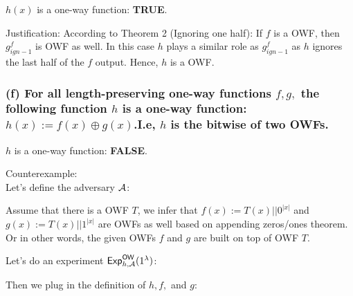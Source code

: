 \(h(x)\) is a one-way function: \textbf{TRUE}.

Justification: According to Theorem 2 (Ignoring one half): If \(f\) is a OWF, then
\(g^f_{ign-1}\) is OWF as well. In this case \(h\) plays a similar role as \(g^f_{ign-1}\)
as \(h\) ignores the last half of the \(f\) output. Hence, \(h\) is a OWF.


\subsubsection{(f) For all length-preserving one-way functions \(f, g,\) the following function
\(h\) is a one-way function: \(h(x):=f(x) \oplus g(x)\).I.e, \(h\) is the bitwise \xor of two OWFs.}

\(h\) is a one-way function: \textbf{FALSE}.

Counterexample:\\
Let's define the adversary \(\mathcal{A}\):
\begin{center}
\end{center}

Assume that there is a OWF \(T\), we infer that \(f(x):= T(x)||0^{|x|}\) and
\(g(x):= T(x)||1^{|x|}\) are OWFs as well based on appending zeros/ones theorem.
Or in other words, the given OWFs \(f\) and \(g\) are built on top of OWF \(T\).

Let's do an experiment \(\mathsf{Exp}_{h, \mathcal{A}}^{\mathsf{OW}}(1^{\lambda})\):
\begin{center}
\end{center}

Then we plug in the definition of \(h, f,\) and \(g\):
\begin{center}
\end{center}


